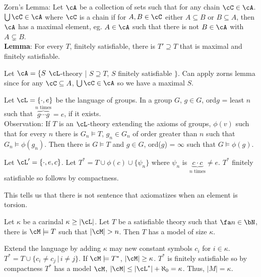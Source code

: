 \noindent
Zorn's Lemma: Let $\cA$ be a collection of sets such that for any chain $\cC \in \cA$. $\bigcup \cC \in \cA$ where $\cC$ is a chain if for $A, B \in \cC$ either $A \subseteq B$ or $B \subseteq A$, then $\cA$ has a maximal element, eg. $A \in \cA$ such that there is not $B \in \cA$ with $A \subsetneq B$. \\

\noindent 
\textbf{Lemma}: For every $T$, finitely satisfiable, there is $T' \supseteq T$ that is maximal and finitely satisfiable. 

\begin{pf}
    Let $\cA = \{S$ $\cL$-theory | $S \supseteq T$, $S$ finitely satisfiable $\}$. Can apply zorns lemma since for any $\cC \subseteq A$, $\bigcup \cC \in \cA$ so we have a maximal $S$. 
\end{pf}

\begin{example}
    Let $\cL = \{ \cdot, e\}$ be the language of groups. In a group $G$, $g \in G$, ord$g$ = least $n$ such that $\overbrace{g \cdots g}^{n \text{ times}} = e$, if it exists. \\
    Observation: If $T$ is an $\cL$-theory extending the axioms of groups, $\phi(v)$ such that for every $n$ there is $G_n \models T$, $g_n \in G_n$ of order greater than $n$ such that $G_n \models \phi(g_n)$. Then there is $G \models T$ and $g \in G$, ord($g$) = $\infty$ such that $G \models \phi(g)$. \\
    \begin{pf}
        Let $\cL' = \{ \cdot, e, c\}$. Let $T^* = T \cup \phi(c) \cup \{\psi_n\}$ where $\psi_n$ is $\underbrace{c \cdot c}_{n \text{ times}} \neq e$. $T^*$ finitely satisfiable so follows by compactness.
    \end{pf}
    This tells us that there is not sentence that axiomatizes when an element is torsion. 
\end{example}

\begin{lemma}
    Let $\kappa$ be a carindal $\kappa \ge | \cL|$. Let $T$ be a satisfiable theory such that $\fa n \in \bN$, there is $\cM \models T$ such that $|\cM| > n$. Then $T$ has a model of size $\kappa$.
\end{lemma}

\begin{pf}
    Extend the language by adding $\kappa$ may new constant symbols $c_i$ for $i \in \kappa$. $T^* = T \cup \{c_i \neq c_j \, | \, i \neq j\}$. If $\cM \models T^*$, $|\cM| \ge \kappa$. $T^*$ is finitely satisfiable so by compactness $T^*$ has a model $\cM$, $|\cM| \le |\cL^*| + \aleph_0 = \kappa$. Thus, $|M| = \kappa$. 
\end{pf}